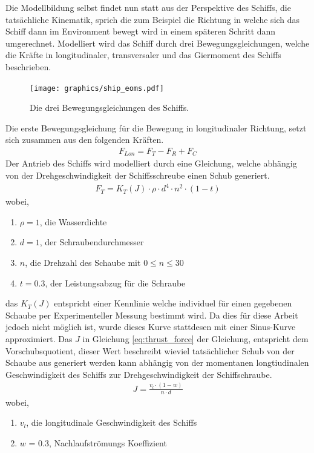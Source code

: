 \documentclass[]{iat}
\begin{document}
Die Modellbildung selbst findet nun statt aus der Perspektive des Schiffs, die tatsächliche Kinematik, sprich die zum Beispiel die Richtung in welche sich das Schiff dann im Environment bewegt wird in einem späteren Schritt dann umgerechnet.
Modelliert wird das Schiff durch drei Bewegungsgleichungen, welche die Kräfte in longitudinaler, transversaler und das Giermoment des Schiffs beschrieben.
\begin{figure}[H]
    \texttt{[image: graphics/ship\_eoms.pdf]}
    \centering
    \caption{Die drei Bewegungsgleichungen des Schiffs.}
    \label{abb:ship_eoms}
\end{figure}
Die erste Bewegungsgleichung für die Bewegung in longitudinaler Richtung, setzt sich zusammen aus den folgenden Kräften.
\begin{align}
    F_{Lon} = F_{T} - F_{R} + F_{C} \label{eq:longitudinal_force}
\end{align}
Der Antrieb des Schiffs wird modelliert durch eine Gleichung, welche abhängig von der Drehgeschwindigkeit der Schiffsschreube einen Schub generiert.
\begin{align}
    F_T = K_T(J) \cdot \rho \cdot d^4 \cdot n^2 \cdot (1-t) \label{eq:thrust_force}
\end{align}
wobei,
\begin{enumerate}
    \item[] $\rho = 1$, die Wasserdichte
    \item[] $d = 1$, der Schraubendurchmesser
    \item[] $n$, die Drehzahl des Schaube mit $0 \leq n \leq 30$
    \item[] $t = 0.3$, der Leistungsabzug für die Schraube
\end{enumerate}
das $K_T(J)$ entspricht einer Kennlinie welche individuel für einen gegebenen Schaube per Experimenteller Messung bestimmt wird. Da dies für diese Arbeit jedoch nicht möglich ist, wurde dieses Kurve stattdesen mit einer Sinus-Kurve approximiert. Das $J$ in Gleichung \ref*{eq:thrust_force} der Gleichung, entspricht dem Vorschubsquotient, dieser Wert beschreibt wieviel tatsächlicher Schub von der Schaube aus generiert werden kann abhängig von der momentanen longtiudinalen Geschwindigkeit des Schiffs zur Drehgeschwindigkeit der Schiffschraube.
\begin{align}
    J = \frac{v_l \cdot (1-w)}{n \cdot d} \label{eq:thrust_coeffcient}
\end{align}
wobei,
\begin{enumerate}
    \item[] $v_l$, die longitudinale Geschwindigkeit des Schiffs
    \item[] $w$ = 0.3, Nachlaufströmungs Koeffizient
\end{enumerate}
\end{document}
